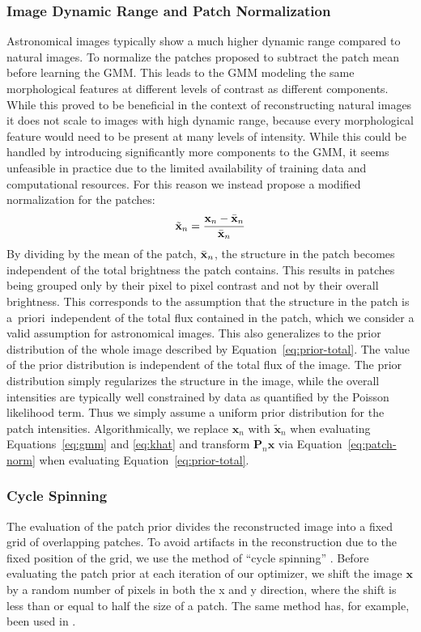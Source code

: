 \documentclass[twocolumn, lineno]{aastex631}
\newcommand{\aprioir}{a~priori~}
\begin{document}
    \subsubsection{Image Dynamic Range and Patch Normalization}
    \label{ssec:patch-norm}
    Astronomical images typically show a much higher dynamic range compared to natural images. To normalize the patches \cite{Zoran2011} proposed to subtract the patch mean before learning the GMM. This leads to the GMM modeling the same morphological features at different levels of contrast as different components. While this proved to be beneficial in the context of reconstructing natural images it does not scale to images with high dynamic range, because every morphological feature would need to be present at many levels of intensity. While this could be handled by introducing significantly more components to the GMM, it seems unfeasible in practice due to the limited availability of training data and computational resources. For this reason we instead propose a modified normalization for the patches:
    \begin{equation}
        \label{eq:patch-norm}
        \tilde{\mathbf{x}}_n = \frac{\mathbf{x}_n - \Bar{\mathbf{x}}_n}{\Bar{\mathbf{x}}_n}
    \end{equation}
    By dividing by the mean of the patch, $\Bar{\mathbf{x}}_n$, the structure in the patch becomes independent of the total brightness the patch contains. This results in patches being grouped only by their pixel to pixel contrast and not by their overall brightness. This corresponds to the assumption that the structure in the patch is \aprioir independent of the total flux contained in the patch, which we consider a valid assumption for astronomical images. This also generalizes to the prior distribution of the whole image described by Equation~\ref{eq:prior-total}. The value of the prior distribution is independent of the total flux of the image. The prior distribution simply regularizes the structure in the image, while the overall intensities are typically well constrained by data as quantified by the Poisson likelihood term. Thus we simply assume a uniform prior distribution for the patch intensities. Algorithmically, we replace $\mathbf{x}_n$ with $\tilde{\mathbf{x}}_n$ when evaluating Equations~\ref{eq:gmm} and \ref{eq:khat} and transform $\mathbf{P}_n\mathbf{x}$ via Equation~\ref{eq:patch-norm} when evaluating Equation~\ref{eq:prior-total}.

    \subsubsection{Cycle Spinning}
    The evaluation of the patch prior divides the reconstructed image into a fixed grid of overlapping patches. To avoid artifacts in the reconstruction due to the fixed position of the grid, we use the method of \enquote{cycle spinning} \citep{Coifman1995}. Before evaluating the patch prior at each iteration of our optimizer, we shift the image $\mathbf{x}$ by a random number of pixels in both the x and y direction, where the shift is less than or equal to half the size of a patch. The same method has, for example, been used in \cite{Esch2004}.
    
\end{document}

